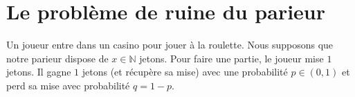 
\section{Le problème de ruine du parieur}
Un joueur entre dans un casino pour jouer à la roulette. Nous supposons que notre parieur dispose de $x\in \mathbb{N}$  jetons. Pour faire une partie, le joueur mise $1$ jetons. Il gagne $1$ jetons (et récupère sa mise) avec une probabilité $p\in(0,1)$ et perd sa mise avec probabilité $q = 1-p$.
